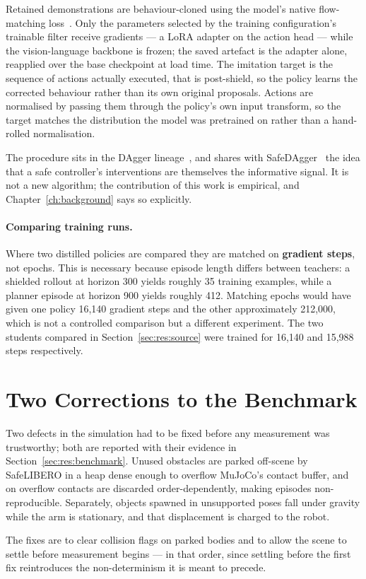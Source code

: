 Retained demonstrations are behaviour-cloned using the model's native flow-matching
loss~\cite{physicalintelligence2025pi05,black2024pi0}. Only the parameters selected by the training
configuration's trainable filter receive gradients --- a LoRA adapter on the action head --- while
the vision-language backbone is frozen; the saved artefact is the adapter alone, reapplied over the
base checkpoint at load time. The imitation target is the sequence of actions actually executed,
that is post-shield, so the policy learns the corrected behaviour rather than its own original
proposals. Actions are normalised by passing them through the policy's own input transform, so the
target matches the distribution the model was pretrained on rather than a hand-rolled
normalisation.

The procedure sits in the DAgger lineage~\cite{ross2011dagger}, and shares with
SafeDAgger~\cite{zhang2017safedagger} the idea that a safe controller's interventions are
themselves the informative signal. It is not a new algorithm; the contribution of this work is
empirical, and Chapter~\ref{ch:background} says so explicitly.

\paragraph{Comparing training runs.}
Where two distilled policies are compared they are matched on \textbf{gradient steps}, not epochs.
This is necessary because episode length differs between teachers: a shielded rollout at horizon
300 yields roughly 35 training examples, while a planner episode at horizon 900 yields roughly 412.
Matching epochs would have given one policy 16{,}140 gradient steps and the other approximately
212{,}000, which is not a controlled comparison but a different experiment. The two students
compared in Section~\ref{sec:res:source} were trained for 16{,}140 and 15{,}988 steps respectively.

\section{Two Corrections to the Benchmark}\label{sec:benchmark_fixes}

Two defects in the simulation had to be fixed before any measurement was trustworthy; both are
reported with their evidence in Section~\ref{sec:res:benchmark}. Unused obstacles are parked
off-scene by SafeLIBERO in a heap dense enough to overflow MuJoCo's contact buffer, and on overflow
contacts are discarded order-dependently, making episodes non-reproducible. Separately, objects
spawned in unsupported poses fall under gravity while the arm is stationary, and that displacement
is charged to the robot.

The fixes are to clear collision flags on parked bodies and to allow the scene to settle before
measurement begins --- in that order, since settling before the first fix reintroduces the
non-determinism it is meant to precede.
